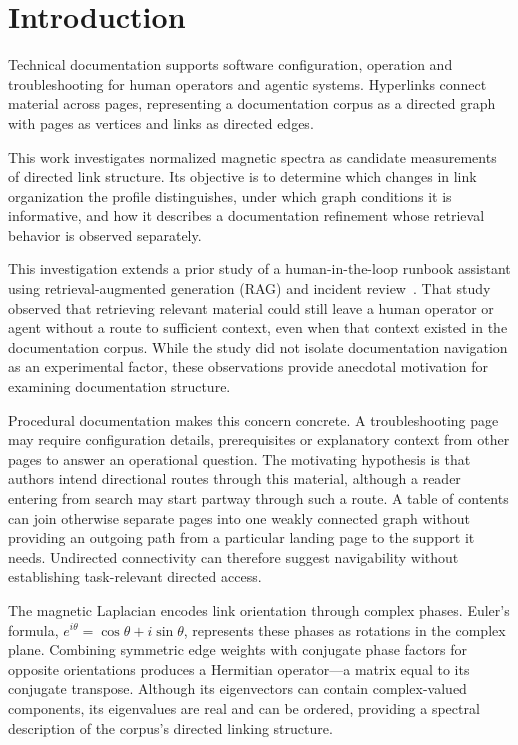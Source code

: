\section{Introduction}
\label{sec:introduction}

Technical documentation supports software configuration, operation and
troubleshooting for human operators and agentic systems. Hyperlinks connect
material across pages, representing a documentation corpus as a directed graph
with pages as vertices and links as directed edges.

This work investigates normalized magnetic spectra as candidate measurements of
directed link structure. Its objective is to determine which changes in link
organization the profile distinguishes, under which graph conditions it is
informative, and how it describes a documentation refinement whose retrieval
behavior is observed separately.

This investigation extends a prior study of a human-in-the-loop runbook
assistant using retrieval-augmented generation (RAG) and incident
review~\cite{dantonio2025runbook}. That study observed that retrieving relevant material
could still leave a human operator or agent without a route to sufficient context,
even when that context existed in the documentation corpus. While the study did not
isolate documentation navigation as an experimental factor, these observations
provide anecdotal motivation for examining documentation structure.

Procedural documentation makes this concern concrete. A troubleshooting page may
require configuration details, prerequisites or explanatory context from other
pages to answer an operational question. The motivating hypothesis is that authors
intend directional routes through this material, although a reader entering from
search may start partway through such a route. A table of contents can join
otherwise separate pages into one weakly connected graph without providing an
outgoing path from a particular landing page to the support it needs. Undirected
connectivity can therefore suggest navigability without establishing task-relevant
directed access.

The magnetic Laplacian encodes link orientation through complex phases. Euler's formula, $e^{i\theta}=\cos\theta+i\sin\theta$, represents these phases as rotations in the complex plane. Combining symmetric edge weights with conjugate phase factors for opposite orientations produces a Hermitian operator---a matrix equal to its conjugate transpose. Although its eigenvectors can contain complex-valued components, its eigenvalues are real and can be ordered, providing a spectral description of the corpus's directed linking structure.

